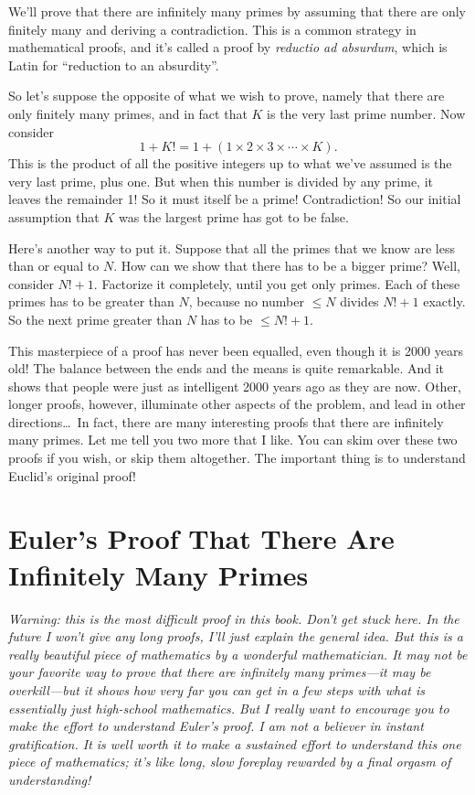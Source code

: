 \documentclass[12pt]{book}
\begin{document}
We'll prove that there are infinitely many primes by assuming that there are only
finitely many and deriving a contradiction. This is a common strategy in mathematical
proofs, and it's called a proof by \emph{reductio ad absurdum}, which is Latin for
``reduction to an absurdity''.

So let's suppose the opposite of what we wish to prove, namely that there are only finitely
many primes, and in fact that $K$ is the very last prime number. Now consider
\[
 1 + K! = 1 + (1 \times 2 \times 3 \times \cdots \times K).
\]
This is the product of all the positive integers up to 
what we've assumed is the very last prime, plus one.
But when this number is divided by any prime, it leaves the remainder 1!  
So it must itself be a prime!
Contradiction!  
So our initial assumption that $K$ was the largest prime has got to be false.

Here's another way to put it. Suppose that all the primes that we know are less than or equal
to $N$. How can we show that there has to be a bigger prime? Well, consider $N! + 1$.
Factorize it completely, until you get only primes.  Each of these primes has to be greater than $N$,
because no number $\leq N$ divides $N! + 1$ exactly. 
So the next prime greater than $N$ has to be $\leq N! + 1$.

This masterpiece of a proof has never been equalled, even though it is 2000 years old!
The balance between the ends and the means is quite remarkable.
And it shows that people were just as intelligent 2000 years ago as they are now.
Other, longer proofs, however, illuminate other aspects of the problem, 
and lead in other directions\ldots\
In fact, there are many interesting proofs that there are infinitely many primes.  Let me tell
you two more that I like.
You can skim over these two proofs if you wish, or skip them altogether. 
The important thing is to understand Euclid's original proof!

\section*{Euler's Proof That There Are Infinitely Many Primes}

\emph{Warning: this is the most difficult proof in this book.
Don't get stuck here.
In the future I won't give any long proofs,
I'll just explain the general idea.  But this is a really beautiful piece of mathematics by
a wonderful mathematician. It may not be your favorite way to prove that there are
infinitely many primes---it may be overkill---but it shows how very far you can get
in a few steps with what is essentially just high-school mathematics.
But I really want to encourage you to make the effort to understand
Euler's proof.  I am not a believer in instant gratification.  It is well worth
it to make a sustained effort to understand this one piece of mathematics; 
it's like long, slow foreplay rewarded by a final orgasm of understanding!}
\end{document}
